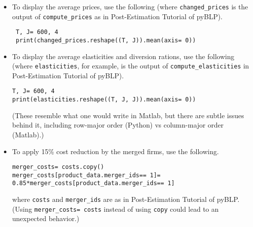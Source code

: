 \documentclass[english,11pt]{article}
\begin{document}
\begin{itemize}
  \item To display the average prices, use the following (where \texttt{changed\_prices} is the output of \texttt{compute\_prices} as in Post-Estimation Tutorial of pyBLP).
    \begin{verbatim}
 T, J= 600, 4
 print(changed_prices.reshape((T, J)).mean(axis= 0))
    \end{verbatim}

    \item To display the average elasticities and diversion rations, use the following (where \texttt{elasticities}, for example, is the output of \texttt{compute\_elasticities} in Post-Estimation Tutorial of pyBLP).
    \begin{verbatim}
T, J= 600, 4
print(elasticities.reshape((T, J, J)).mean(axis= 0))
    \end{verbatim}
    (These resemble what one would write in Matlab, but there are subtle issues behind it, including row-major order (Python) vs column-major order (Matlab).)

    \item To apply 15\% cost reduction by the merged firms, use the following.
   
    \begin{verbatim}
merger_costs= costs.copy()
merger_costs[product_data.merger_ids== 1]= 0.85*merger_costs[product_data.merger_ids== 1]
    \end{verbatim}
    \noindent where \texttt{costs} and \texttt{merger\_ids} are as in Post-Estimation Tutorial of pyBLP. (Using \texttt{merger\_costs= costs} instead of using \texttt{copy} could lead to an unexpected behavior.)


\end{itemize}
\end{document}
